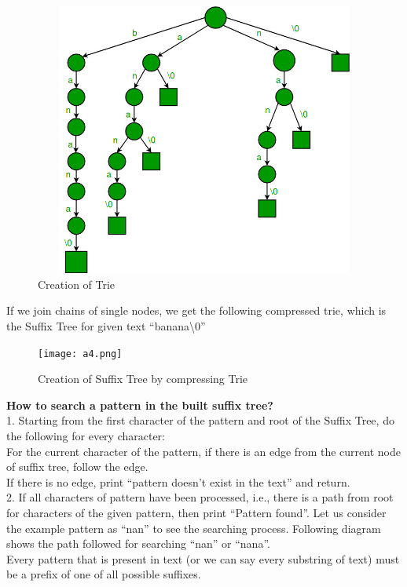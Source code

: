\documentclass[11pt,a4paper]{article}
\begin{document}
\vspace{0.4cm}
\begin{figure}[H]
    \centering
    \includegraphics[width=17cm, height=9cm]{a3.png}
    \caption{Creation of Trie}
    \label{fig:StoringExample}
\end{figure}
If we join chains of single nodes, we get the following compressed trie, which is the Suffix Tree for given text “banana\textbackslash0” 
\begin{figure}[H]
    \centering
    \texttt{[image: a4.png]}
    \caption{Creation of Suffix Tree by compressing Trie}
\end{figure}
\textbf{How to search a pattern in the built suffix tree? }
\\
1. Starting from the first character of the pattern and root of the Suffix Tree, do the following for every character:
\\
 For the current character of the pattern, if there is an edge from the current node of suffix tree, follow the edge.
\\
 If there is no edge, print “pattern doesn’t exist in the text” and return.
\\
2. If all characters of pattern have been processed, i.e., there is a path from root for characters of the given pattern, then print “Pattern found”. Let us consider the example pattern as “nan” to see the searching process. Following diagram shows the path followed for searching “nan” or “nana”.
\\
Every pattern that is present in text (or we can say every substring of text) must be a prefix of one of all possible suffixes.
\end{document}
